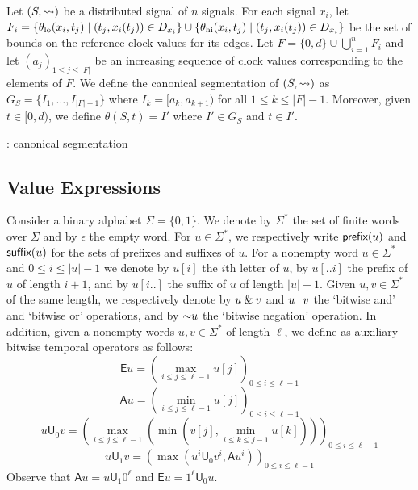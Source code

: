 Let $(S,{\rightsquigarrow})$ be a distributed signal of $n$ signals.
For each signal $x_i$, let $F_i = \{\theta_{\text{lo}}(x_i, t_j) \st (t_j, x_i(t_j)) \in D_{x_i}\} \cup \{\theta_{\text{hi}}(x_i, t_j) \st (t_j, x_i(t_j)) \in D_{x_i}\}$ be the set of bounds on the reference clock values for its edges.
Let $F = \{0, d\} \cup \bigcup_{i = 1}^{n} F_i$ and let $(a_j)_{1 \leq j \leq |F|}$ be an increasing sequence of clock values corresponding to the elements of $F$.
We define the canonical segmentation of $(S,{\rightsquigarrow})$ as $G_S = \{I_1, \ldots, I_{|F| - 1}\}$ where $I_k = [a_k, a_{k+1})$ for all $1 \leq k \leq |F| - 1$.
Moreover, given $t \in [0,d)$, we define $\theta(S,t) = I'$ where $I' \in G_S$ and $t \in I'$.

\begin{example}
	\TODO: canonical segmentation
\end{example}

\subsection{Value Expressions}
Consider a binary alphabet $\Sigma = \{0,1\}$.
We denote by $\Sigma^*$ the set of finite words over $\Sigma$ and by $\epsilon$ the empty word.
For $u \in \Sigma^*$, we respectively write $\textsf{prefix}(u)$ and $\textsf{suffix}(u)$ for the sets of prefixes and suffixes of $u$.
For a nonempty word $u \in \Sigma^*$ and $0 \leq i \leq |u| - 1$ we denote by $u[i]$ the $i$th letter of $u$, by $u[..i]$ the prefix of $u$ of length $i+1$, and by $u[i..]$ the suffix of $u$ of length $|u| - 1$. 
Given $u,v \in \Sigma^*$ of the same length, we respectively denote by $u \mathbin{\&} v$ and $u \mathbin{|} v$ the `bitwise and' and `bitwise or' operations, and by $\mathord{\sim} u$ the `bitwise negation' operation.
In addition, given a nonempty words $u,v \in \Sigma^*$ of length $\ell$, we define as auxiliary bitwise temporal operators as follows:
$$ \mathsf{E} u = \left( \max_{i \leq j \leq \ell - 1} u[j] \right)_{0 \leq i \leq \ell - 1} $$
$$ \mathsf{A} u = \left( \min_{i \leq j \leq \ell - 1} u[j] \right)_{0 \leq i \leq \ell - 1} $$
$$ u \mathsf{U}_0 v = \left( \max_{i \leq j \leq \ell - 1} \left( \min \left( v[j], \min_{i \leq k \leq j - 1} u[k] \right) \right) \right)_{0 \leq i \leq \ell - 1} $$
$$ u \mathsf{U}_1 v = \left( \max \left( u^i \mathsf{U}_0 v^i, \mathsf{A} u^i \right) \right)_{0 \leq i \leq \ell - 1} $$
Observe that $\mathsf{A} u = u \mathsf{U}_1 0^\ell$ and $\mathsf{E} u = 1^\ell \mathsf{U}_0 u$.

